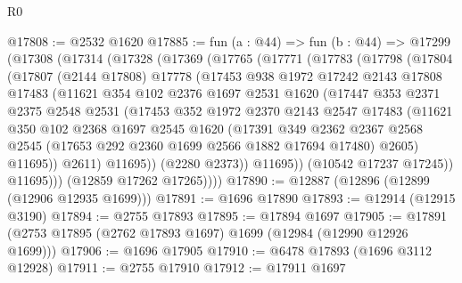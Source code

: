\begin{lexlean}{R0}
\begin{coremodule}
@17808 := @2532 @1620
@17885 := fun (a : @44) =>
  fun (b : @44) =>
  @17299
    (@17308
      (@17314
        (@17328
          (@17369
            (@17765
              (@17771
                (@17783
                  (@17798
                    (@17804
                      (@17807
                        (@2144 @17808)
                        @17778
                        (@17453
                          @938
                          @1972
                          @17242
                          @2143
                          @17808
                          @17483
                          (@11621
                            @354
                            @102
                            @2376
                            @1697
                            @2531
                            @1620
                            (@17447
                              @353
                              @2371
                              @2375
                              @2548
                              @2531
                              (@17453
                                @352
                                @1972
                                @2370
                                @2143
                                @2547
                                @17483
                                (@11621
                                  @350
                                  @102
                                  @2368
                                  @1697
                                  @2545
                                  @1620
                                  (@17391
                                    @349
                                    @2362
                                    @2367
                                    @2568
                                    @2545
                                    (@17653 @292 @2360 @1699 @2566 @1882 @17694 @17480)
                                    @2605)
                                  @11695))
                              @2611)
                            @11695))
                        (@2280 @2373))
                      @11695))
                  (@10542 @17237 @17245))
                @11695)))
          (@12859 @17262 @17265))))
@17890 := @12887 (@12896 (@12899 (@12906 @12935 @1699)))
@17891 := @1696 @17890
@17893 := @12914 (@12915 @3190)
@17894 := @2755 @17893
@17895 := @17894 @1697
@17905 := @17891 (@2753 @17895 (@2762 @17893 @1697) @1699 (@12984 (@12990 @12926 @1699)))
@17906 := @1696 @17905
@17910 := @6478 @17893 (@1696 @3112 @12928)
@17911 := @2755 @17910
@17912 := @17911 @1697

\end{coremodule}
\end{lexlean}
